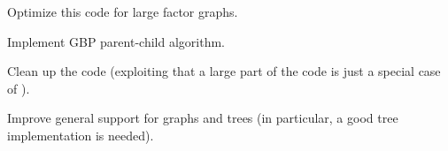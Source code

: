 \begin{DoxyRefList}
Optimize this code for large factor graphs. 



Implement GBP parent-\/child algorithm.  
\item[File \doxylink{treeep_8h}{treeep.h} ]\label{todo__todo000018}%
%
Clean up the  code (exploiting that a large part of the code is just a special case of ).  
\item[File \doxylink{weightedgraph_8h}{weightedgraph.h} ]\label{todo__todo000021}%
%
Improve general support for graphs and trees (in particular, a good tree implementation is needed). 
\end{DoxyRefList}